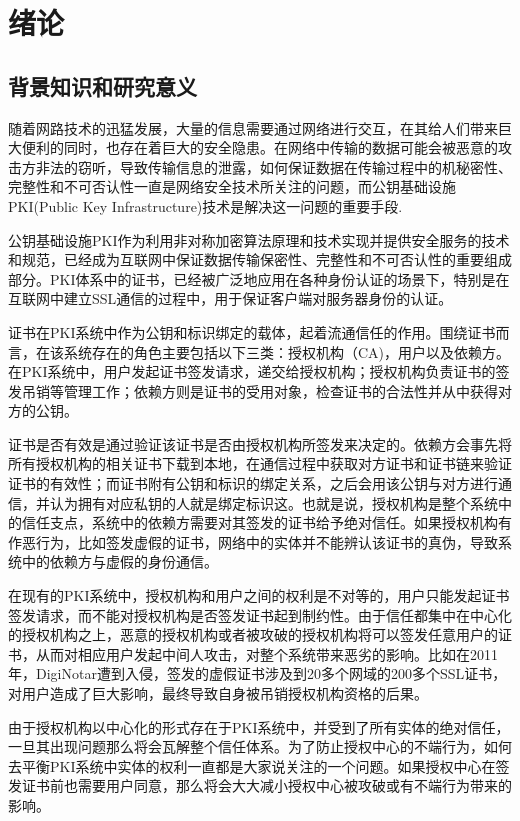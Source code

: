 
\chapter{绪论}

\section{背景知识和研究意义}

随着网路技术的迅猛发展，大量的信息需要通过网络进行交互，在其给人们带来巨大便利的同时，也存在着巨大的安全隐患。在网络中传输的数据可能会被恶意的攻击方非法的窃听，导致传输信息的泄露，如何保证数据在传输过程中的机秘密性、完整性和不可否认性一直是网络安全技术所关注的问题，而公钥基础设施PKI(Public Key Infrastructure)技术是解决这一问题的重要手段.


公钥基础设施PKI作为利用非对称加密算法原理和技术实现并提供安全服务的技术和规范，已经成为互联网中保证数据传输保密性、完整性和不可否认性的重要组成部分。PKI体系中的证书，已经被广泛地应用在各种身份认证的场景下，特别是在互联网中建立SSL通信的过程中，用于保证客户端对服务器身份的认证。


证书在PKI系统中作为公钥和标识绑定的载体，起着流通信任的作用。围绕证书而言，在该系统存在的角色主要包括以下三类：授权机构（CA)，用户以及依赖方。在PKI系统中，用户发起证书签发请求，递交给授权机构；授权机构负责证书的签发吊销等管理工作；依赖方则是证书的受用对象，检查证书的合法性并从中获得对方的公钥。

证书是否有效是通过验证该证书是否由授权机构所签发来决定的。依赖方会事先将所有授权机构的相关证书下载到本地，在通信过程中获取对方证书和证书链来验证证书的有效性；而证书附有公钥和标识的绑定关系，之后会用该公钥与对方进行通信，并认为拥有对应私钥的人就是绑定标识这。也就是说，授权机构是整个系统中的信任支点，系统中的依赖方需要对其签发的证书给予绝对信任。如果授权机构有作恶行为，比如签发虚假的证书，网络中的实体并不能辨认该证书的真伪，导致系统中的依赖方与虚假的身份通信。

在现有的PKI系统中，授权机构和用户之间的权利是不对等的，用户只能发起证书签发请求，而不能对授权机构是否签发证书起到制约性。由于信任都集中在中心化的授权机构之上，恶意的授权机构或者被攻破的授权机构将可以签发任意用户的证书，从而对相应用户发起中间人攻击，对整个系统带来恶劣的影响。比如在2011年，DigiNotar遭到入侵，签发的虚假证书涉及到20多个网域的200多个SSL证书\supercite{prins2011diginotar}，对用户造成了巨大影响，最终导致自身被吊销授权机构资格的后果。

由于授权机构以中心化的形式存在于PKI系统中，并受到了所有实体的绝对信任，一旦其出现问题那么将会瓦解整个信任体系。为了防止授权中心的不端行为，如何去平衡PKI系统中实体的权利一直都是大家说关注的一个问题。如果授权中心在签发证书前也需要用户同意，那么将会大大减小授权中心被攻破或有不端行为带来的影响。

